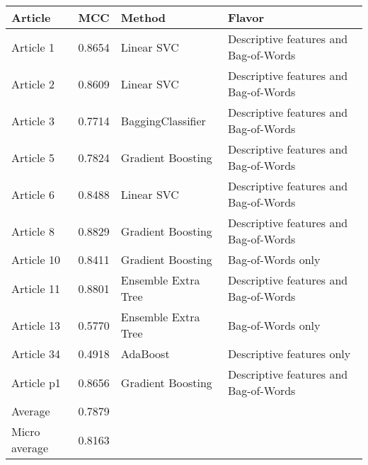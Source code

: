 \begin{tabular}{|l|l|l|l| }
\hline
Article & MCC & Method & Flavor \\ \hline
Article 1 & 0.8654 & Linear SVC & Descriptive features and Bag-of-Words\\
Article 2 & 0.8609 & Linear SVC & Descriptive features and Bag-of-Words\\
Article 3 & 0.7714 & BaggingClassifier & Descriptive features and Bag-of-Words\\
Article 5 & 0.7824 & Gradient Boosting & Descriptive features and Bag-of-Words\\
Article 6 & 0.8488 & Linear SVC & Descriptive features and Bag-of-Words\\
Article 8 & 0.8829 & Gradient Boosting & Descriptive features and Bag-of-Words\\
Article 10 & 0.8411 & Gradient Boosting & Bag-of-Words only\\
Article 11 & 0.8801 & Ensemble Extra Tree & Descriptive features and Bag-of-Words\\
Article 13 & 0.5770 & Ensemble Extra Tree & Bag-of-Words only\\
Article 34 & 0.4918 & AdaBoost & Descriptive features only\\
Article p1 & 0.8656 & Gradient Boosting & Descriptive features and Bag-of-Words\\
Average & 0.7879 & & \\
Micro average & 0.8163 & & \\
\hline
\end{tabular}